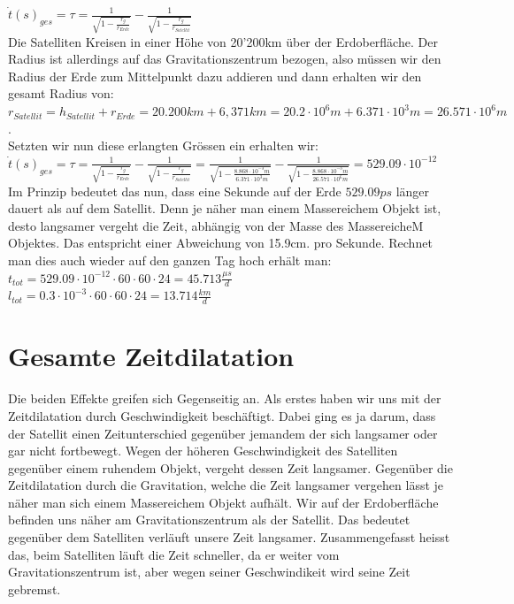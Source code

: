 \begin{refsection}
\( \dot t(s)_ {ges} = \tau = \frac{1}{\sqrt{1-\frac{r_g}{r_{Erde}}}} - \frac{1}{\sqrt{1-\frac{r_g}{r_{Satellit}}}} \) \\

Die Satelliten Kreisen in einer Höhe von 20'200km über der Erdoberfläche. Der Radius ist allerdings auf das Gravitationszentrum bezogen, also müssen wir den Radius der Erde zum Mittelpunkt dazu addieren und dann erhalten wir den gesamt Radius von:\\

 \( r_{Satellit} = h_{Satellit} + r_{Erde} = 20.200 km + 6,371 km = 20.2 \cdot 10^6m + 6.371 \cdot 10^3m = 26.571 \cdot 10^6m \).\\

\noindent{}Setzten wir nun diese erlangten Grössen ein erhalten wir:\\

\( \dot t(s)_ {ges} = \tau = \frac{1}{\sqrt{1-\frac{r_g}{r_{Erde}}}} - \frac{1}{\sqrt{1-\frac{r_g}{r_{Satellit}}}} =  
\frac{1}{\sqrt{1-\frac{8.868 \cdot 10^{-3}m}{ 6.371 \cdot 10^3m}}} - \frac{1}{\sqrt{1-\frac{8.868 \cdot 10^{-3}m}{ 26.571 \cdot 10^6m}}} =  529.09 \cdot 10^{-12} \) \\

Im Prinzip bedeutet das nun, dass eine Sekunde auf der Erde \( 529.09ps \) länger dauert als auf dem Satellit. Denn je näher man einem Massereichem Objekt ist, desto langsamer vergeht die Zeit, abhängig von der Masse des MassereicheM Objektes. Das entspricht einer Abweichung von 15.9cm. pro Sekunde. Rechnet man dies auch wieder auf den ganzen Tag hoch erhält man: \\

\( t_{tot} = 529.09 \cdot 10^{-12} \cdot 60 \cdot 60 \cdot 24 = 45.713\frac{\mu{}s}{d} \) \\

\( l_{tot} = 0.3 \cdot 10^{-3} \cdot 60 \cdot 60 \cdot 24 = 13.714\frac{km}{d} \) \\

\section{Gesamte Zeitdilatation}
Die beiden Effekte greifen sich Gegenseitig an. Als erstes haben wir uns mit der Zeitdilatation durch Geschwindigkeit beschäftigt. Dabei ging es ja darum, dass der Satellit einen Zeitunterschied gegenüber jemandem der sich langsamer oder gar nicht fortbewegt. Wegen der höheren Geschwindigkeit des Satelliten gegenüber einem ruhendem Objekt, vergeht dessen Zeit langsamer. Gegenüber die Zeitdilatation durch die Gravitation, welche die Zeit langsamer vergehen lässt je näher man sich einem Massereichem Objekt aufhält. Wir auf der Erdoberfläche befinden uns näher am Gravitationszentrum als der Satellit. Das bedeutet gegenüber dem Satelliten verläuft unsere Zeit langsamer. Zusammengefasst heisst das, beim Satelliten läuft die Zeit schneller, da er weiter vom Gravitationszentrum ist, aber wegen seiner Geschwindikeit wird seine Zeit gebremst.


\end{refsection}
